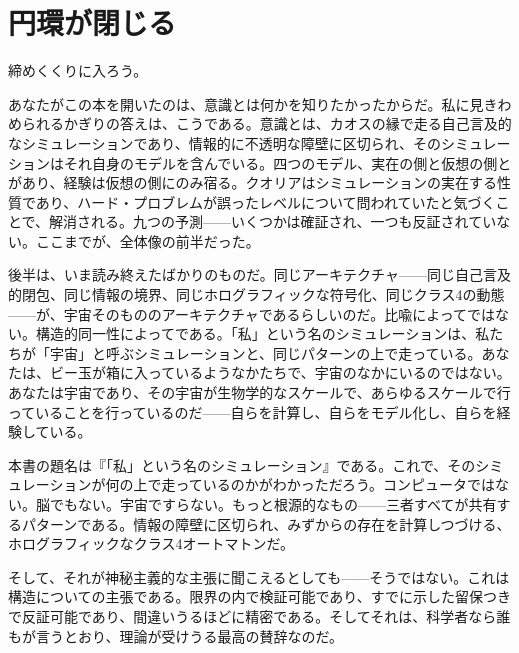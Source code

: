 \documentclass[11pt, twoside, openright]{book}
\begin{document}
\section*{円環が閉じる}

締めくくりに入ろう。

あなたがこの本を開いたのは、意識とは何かを知りたかったからだ。私に見きわめられるかぎりの答えは、こうである。意識とは、カオスの縁で走る自己言及的なシミュレーションであり、情報的に不透明な障壁に区切られ、そのシミュレーションはそれ自身のモデルを含んでいる。四つのモデル、実在の側と仮想の側とがあり、経験は仮想の側にのみ宿る。クオリアはシミュレーションの実在する性質であり、ハード・プロブレムが誤ったレベルについて問われていたと気づくことで、解消される。九つの予測------いくつかは確証され、一つも反証されていない。ここまでが、全体像の前半だった。

後半は、いま読み終えたばかりのものだ。同じアーキテクチャ------同じ自己言及的閉包、同じ情報の境界、同じホログラフィックな符号化、同じクラス4の動態------が、宇宙そのもののアーキテクチャであるらしいのだ。比喩によってではない。構造的同一性によってである。「私」という名のシミュレーションは、私たちが「宇宙」と呼ぶシミュレーションと、同じパターンの上で走っている。あなたは、ビー玉が箱に入っているようなかたちで、宇宙のなかにいるのではない。あなたは宇宙であり、その宇宙が生物学的なスケールで、あらゆるスケールで行っていることを行っているのだ------自らを計算し、自らをモデル化し、自らを経験している。

本書の題名は『「私」という名のシミュレーション』である。これで、そのシミュレーションが何の上で走っているのかがわかっただろう。コンピュータではない。脳でもない。宇宙ですらない。もっと根源的なもの------三者すべてが共有するパターンである。情報の障壁に区切られ、みずからの存在を計算しつづける、ホログラフィックなクラス4オートマトンだ。

そして、それが神秘主義的な主張に聞こえるとしても------そうではない。これは構造についての主張である。限界の内で検証可能であり、すでに示した留保つきで反証可能であり、間違いうるほどに精密である。そしてそれは、科学者なら誰もが言うとおり、理論が受けうる最高の賛辞なのだ。
\end{document}
